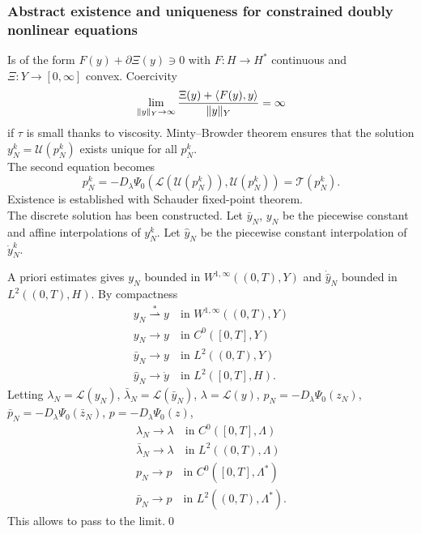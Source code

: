 \documentclass[8pt]{beamer}
\numberwithin{equation}{section}
\theoremstyle{definition}
\DeclarePairedDelimiter{\norm}{\lVert}{\rVert}
\DeclarePairedDelimiter{\dual}{\langle}{\rangle}
\begin{document}
\begin{frame}
\frametitle{Abstract existence and uniqueness for constrained doubly nonlinear equations}
\centering
\begin{minipage}[c]{0.47\textwidth}
Is of the form $F(y)+\partial\Xi(y)\ni0$ with $F\colon H\to H^*$ continuous and $\Xi\colon Y\to[0,\infty]$ convex. Coercivity
\[
\lim_{\norm{y}_Y\to\infty}\frac{\Xi(y)+\dual{F(y),y}}{\norm{y}_Y}=\infty
\]
if $\tau$ is small thanks to viscosity. Minty--Browder theorem ensures that the solution $y_N^k=\mathcal{U}(p_N^k)$ exists unique for all $p_N^k$.
\\[0.5em]
The second equation becomes
\[
p_N^k=-D_\lambda\Psi_0(\mathcal{L}(\mathcal{U}(p_N^k)),\mathcal{U}(p_N^k))=\mathcal{T}(p_N^k).
\]
Existence is established with Schauder fixed-point theorem.
\\[0.5em]
The discrete solution has been constructed. Let $\bar y_N$, $y_N$ be the piecewise constant and affine interpolations of $y_N^k$. Let $\hat y_N$ be the piecewise constant interpolation of $\dot y_N^k$.
\end{minipage}
\hspace{0.02\textwidth}
\begin{minipage}[c]{0.47\textwidth}
A priori estimates gives $y_N$ bounded in $W^{1,\infty}((0,T),Y)$ and $\dot{\hat y}_N$ bounded in $L^2((0,T),H)$. By compactness
\begin{gather*}
y_N\overset{*}{\rightharpoonup}y\quad\text{in $W^{1,\infty}((0,T),Y)$} \\
y_N\to y\quad\text{in $C^0([0,T],Y)$} \\
\bar y_N\to y\quad\text{in $L^2((0,T),Y)$} \\
\hat y_N\to\dot y\quad\text{in $L^2([0,T],H)$}.
\end{gather*}
Letting $\lambda_N=\mathcal{L}(y_N)$, $\bar\lambda_N=\mathcal{L}(\bar y_N)$, $\lambda=\mathcal{L}(y)$, $p_N=-D_\lambda\Psi_0(z_N)$, $\bar p_N=-D_\lambda\Psi_0(\bar z_N)$, $p=-D_\lambda\Psi_0(z)$,
\begin{gather*}
\lambda_N\to\lambda\quad\text{in $C^0([0,T],\Lambda)$} \\
\bar\lambda_N\to\lambda\quad\text{in $L^2((0,T),\Lambda)$} \\
p_N\to p\quad\text{in $C^0([0,T],\Lambda^*)$} \\
\bar p_N\to p\quad\text{in $L^2((0,T),\Lambda^*)$}.
\end{gather*}
This allows to pass to the limit.\qed
\end{minipage}
\end{frame}
\end{document}

